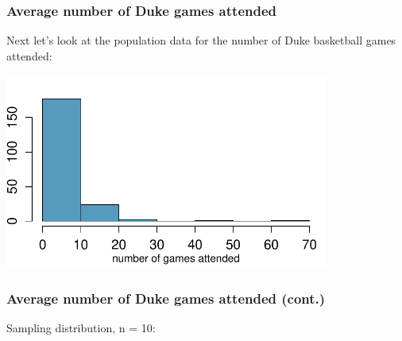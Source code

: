 \documentclass[11pt,containsverbatim,handout,xcolor=xelatex,dvipsnames,table]{beamer}
\newcommand{\soln}[1]{}
\begin{document}

\begin{frame}[fragile]
\frametitle{Average number of Duke games attended}

Next let's look at the population data for the number of Duke basketball games attended:

\begin{center}
\includegraphics[width=0.8\textwidth]{figures/duke_games/hist_duke_games_pop}
\end{center}



\end{frame}


\begin{frame}[fragile]
\frametitle{Average number of Duke games attended (cont.)}

Sampling distribution, n = 10:

{
\soln{\only<2->{Sample mean, $\bar{x}$, of samples of size $n = 10$.}}
\soln{\only<3->{Smaller, sample means will vary less than individual observations.}}
}


\end{frame}
\end{document}
